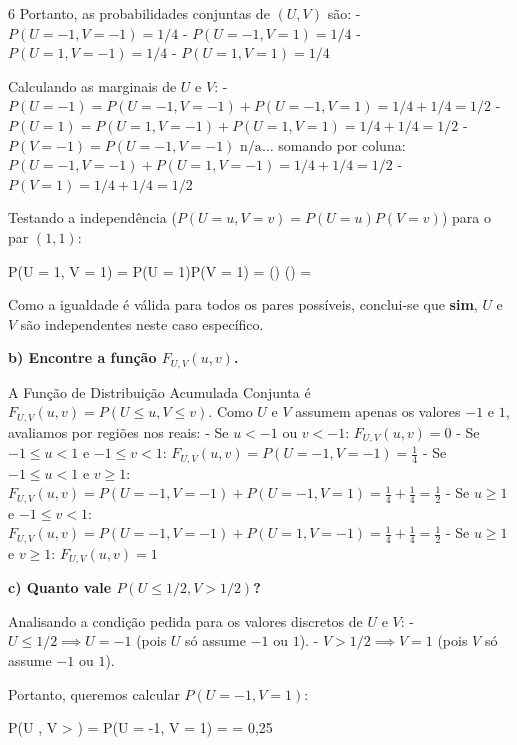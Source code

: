 \documentclass[8pt, a4paper, landscape]{extarticle}
\begin{document}
\begin{multicols}{6}
Portanto, as probabilidades conjuntas de $(U,V)$ são:
- $P(U = -1, V = -1) = 1/4$
- $P(U = -1, V = 1) = 1/4$
- $P(U = 1, V = -1) = 1/4$
- $P(U = 1, V = 1) = 1/4$

Calculando as marginais de $U$ e $V$:
- $P(U = -1) = P(U=-1, V=-1) + P(U=-1, V=1) = 1/4 + 1/4 = 1/2$
- $P(U = 1) = P(U=1, V=-1) + P(U=1, V=1) = 1/4 + 1/4 = 1/2$
- $P(V = -1) = P(U=-1, V=-1) \text{ n/a} \dots$ somando por coluna: $P(U=-1, V=-1) + P(U=1, V=-1) = 1/4 + 1/4 = 1/2$
- $P(V = 1) = 1/4 + 1/4 = 1/2$

Testando a independência ($P(U=u, V=v) = P(U=u)P(V=v)$) para o par $(1,1)$:
\begin{eqfit}
P(U = 1, V = 1) =  \quad {} \quad P(U = 1)P(V = 1) = \left(\right) \left(\right) = 
\end{eqfit}
Como a igualdade é válida para todos os pares possíveis, conclui-se que \textbf{sim}, $U$ e $V$ são independentes neste caso específico.

\vspace{0.3cm}
\textbf{b) Encontre a função $F_{U,V}(u, v)$.}
\vspace{0.2cm}

A Função de Distribuição Acumulada Conjunta é $F_{U,V}(u,v) = P(U \le u, V \le v)$. Como $U$ e $V$ assumem apenas os valores $-1$ e $1$, avaliamos por regiões nos reais:
- Se $u < -1$ ou $v < -1$: $F_{U,V}(u,v) = 0$
- Se $-1 \le u < 1$ e $-1 \le v < 1$: 
  $F_{U,V}(u,v) = P(U = -1, V = -1) = \frac{1}{4}$
- Se $-1 \le u < 1$ e $v \ge 1$: 
  $F_{U,V}(u,v) = P(U = -1, V = -1) + P(U = -1, V = 1) = \frac{1}{4} + \frac{1}{4} = \frac{1}{2}$
- Se $u \ge 1$ e $-1 \le v < 1$: 
  $F_{U,V}(u,v) = P(U = -1, V = -1) + P(U = 1, V = -1) = \frac{1}{4} + \frac{1}{4} = \frac{1}{2}$
- Se $u \ge 1$ e $v \ge 1$: 
  $F_{U,V}(u,v) = 1$

\vspace{0.3cm}
\textbf{c) Quanto vale $P(U \le 1/2, V > 1/2)$?}
\vspace{0.2cm}

Analisando a condição pedida para os valores discretos de $U$ e $V$:
- $U \le 1/2 \implies U = -1$ (pois $U$ só assume $-1$ ou $1$).
- $V > 1/2 \implies V = 1$ (pois $V$ só assume $-1$ ou $1$).

Portanto, queremos calcular $P(U = -1, V = 1)$:
\begin{eqfit}
P\left(U \le {}, V > \right) = P(U = -1, V = 1) =  = 0,25
\end{eqfit}


\end{multicols}
\end{document}
